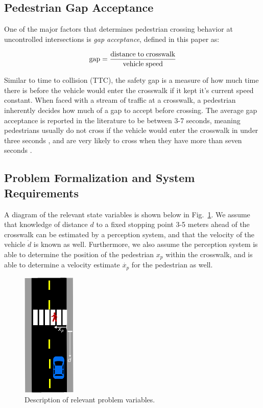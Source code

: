 \documentclass[letterpaper, 10 pt, conference]{ieeeconf}  %
\begin{document}
\subsection{Pedestrian Gap Acceptance}

One of the major factors that determines pedestrian crossing behavior at uncontrolled intersections is \textit{gap acceptance}, defined in this paper as:

\begin{equation}
\mathrm{gap} = \frac{\mathrm{distance\hspace{1mm}to\hspace{1mm}crosswalk}}{\mathrm{vehicle\hspace{1mm}speed}}
\end{equation} 

Similar to time to collision (TTC), the safety gap is a measure of how much time there is before the vehicle would enter the crosswalk if it kept it's current speed constant. When faced with a stream of traffic at a crosswalk, a pedestrian inherently decides how much of a gap to accept before crossing. The average gap acceptance is reported in the literature to be between 3-7 seconds, meaning pedestrians usually do not cross if the vehicle would enter the crosswalk in under three seconds \cite{DiPietroCharlesMandKing1970}, and are very likely to cross when they have more than seven seconds \cite{Schmidt2009}. 

\subsection{Problem Formalization and System Requirements}

A diagram of the relevant state variables is shown below in Fig.~\ref{fig:diagram1}. We assume that knowledge of distance $d$ to a fixed stopping point 3-5 meters ahead of the crosswalk can be estimated by a perception system, and that the velocity of the vehicle $\dot{d}$ is known as well. Furthermore, we also assume the perception system is able to determine the position of the pedestrian $x_p$ within the crosswalk, and is able to determine a velocity estimate $\dot{x_p}$ for the pedestrian as well. 

\begin{figure}
\centering
\includegraphics[width=1in]{figures/diagram.eps}
\caption{Description of relevant problem variables.}
\label{fig:diagram1}
\end{figure}
\end{document}
